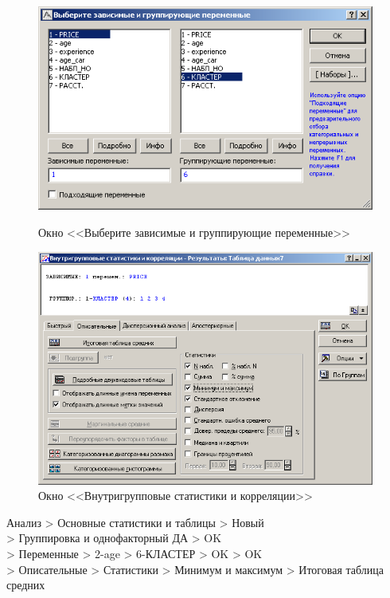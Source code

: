 \begin{figure}[!h]
  \centering
  \begin{minipage}{0.49\textwidth}
    \centering

    \includegraphics[width=0.99\textwidth]
    {inc/cars_my/3.3.PNG}

    \caption{Окно <<Выберите зависимые и группирующие переменные>>}
    \label{fig:3_3}
  \end{minipage}
  \begin{minipage}{0.49\textwidth}
    \centering

    \includegraphics[width=0.99\textwidth]
    {inc/cars_my/3.4.PNG}

    \caption{Окно <<Внутригрупповые статистики и корреляции>>}
    \label{fig:3_4}
  \end{minipage}
\end{figure}

Анализ > Основные статистики и таблицы > Новый\\
> Группировка и однофакторный ДА > OK\\
> Переменные > 2-age > 6-КЛАСТЕР > OK > OK\\
> Описательные > Статистики > Минимум и максимум > Итоговая таблица средних

